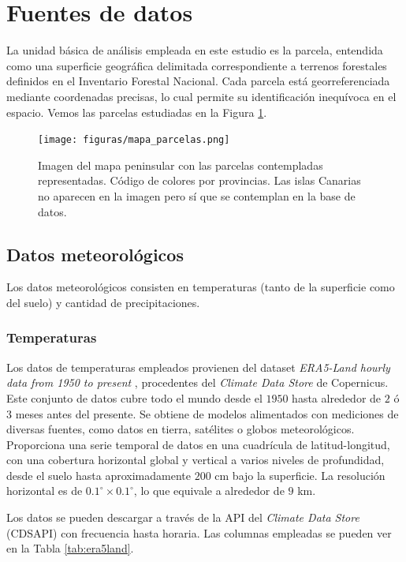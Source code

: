 \section{Fuentes de datos}

La unidad básica de análisis empleada en este estudio es la parcela, entendida como una superficie geográfica delimitada correspondiente a terrenos forestales definidos en el Inventario Forestal Nacional. Cada parcela está georreferenciada mediante coordenadas precisas, lo cual permite su identificación inequívoca en el espacio. Vemos las parcelas estudiadas en la Figura \ref{fig:parcelas}.

\begin{figure}[H]
    \centering
    \texttt{[image: figuras/mapa\_parcelas.png]}
    \caption{\small Imagen del mapa peninsular con las parcelas contempladas representadas. Código de colores por provincias. Las islas Canarias no aparecen en la imagen pero sí que se contemplan en la base de datos.}
    \label{fig:parcelas}
\end{figure}

\subsection{Datos meteorológicos}
Los datos meteorológicos consisten en temperaturas (tanto de la superficie como del suelo) y cantidad de precipitaciones.

\subsubsection*{Temperaturas}


Los datos de temperaturas empleados provienen del dataset \textit{ERA5-Land hourly data from 1950 to present} \cite{copuernicus_temps}, procedentes del \textit{Climate Data Store} de Copernicus. Este conjunto de datos cubre todo el mundo desde el $1950$ hasta alrededor de $2$ ó $3$ meses antes del presente. Se obtiene de modelos alimentados con mediciones de diversas fuentes, como datos en tierra, satélites o globos meteorológicos. Proporciona una serie temporal de datos en una cuadrícula de latitud-longitud, con una cobertura horizontal global y vertical a varios niveles de profundidad, desde el suelo hasta aproximadamente $200$ cm bajo la superficie. La resolución horizontal es de $0.1^\circ \times 0.1^\circ$, lo que equivale a alrededor de $9$ km.

\medskip

Los datos se pueden descargar a través de la API del \textit{Climate Data Store} (CDSAPI) \cite{copernicus_api} con frecuencia hasta horaria. Las columnas empleadas se pueden ver en la Tabla \ref{tab:era5land}.

